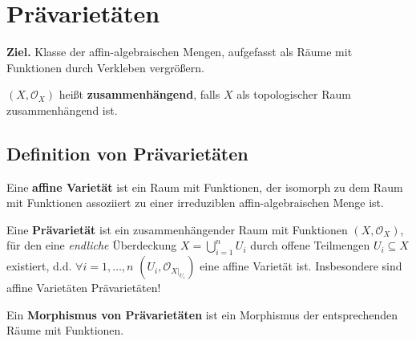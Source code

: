 
\chapter*{Prävarietäten}

\textbf{Ziel.} Klasse der affin-algebraischen Mengen, aufgefasst
als Räume mit Funktionen durch Verkleben vergrößern.

$(X,\mathcal{O}_{X})$ heißt \textbf{zusammenhängend}, falls $X$
als topologischer Raum zusammenhängend ist.

\section{Definition von Prävarietäten}
\label{sec:def-praevarietaet}
\begin{defn}[orig. 37]
  \label{def:affine-varietaet}
  Eine \textbf{affine Varietät} ist ein Raum
  mit Funktionen, der isomorph zu dem Raum mit Funktionen assoziiert zu einer irreduziblen affin-algebraischen Menge ist.
\end{defn}

\begin{defn}[orig. 38]
  \label{def:praevarietaet}
  Eine \textbf{Prävarietät} ist ein zusammenhängender Raum mit Funktionen
  $(X,\mathcal{O}_{X})$, für den eine \emph{endliche }Überdeckung $X=\bigcup_{i=1}^{n}U_{i}$ durch offene Teilmengen $U_i \subseteq X$
  existiert, d.d. $\forall i=1,\ldots,n$ $(U_{i},\mathcal{O}_{X|_{U_{i}}})$
  eine affine Varietät ist.  Insbesondere sind affine Varietäten Prävarietäten!

  Ein \textbf{Morphismus von Prävarietäten} ist ein Morphismus der entsprechenden Räume mit Funktionen.
\end{defn}

